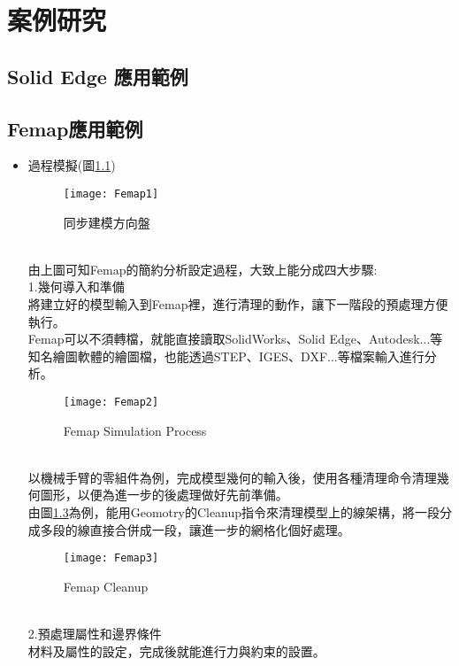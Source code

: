 \chapter{案例研究}
\section{Solid Edge 應用範例}
\section{Femap應用範例}
\begin{itemize}
\item 過程模擬(圖\ref{3.02})\\
\begin{figure}[hbt!]
\begin{center}
\texttt{[image: Femap1]}
\caption{\Large 同步建模方向盤}\label{3.02}
\end{center}
\end{figure}
\\
\qquad 由上圖可知Femap的簡約分析設定過程，大致上能分成四大步驟:\\

1.幾何導入和準備\\
\qquad 將建立好的模型輸入到Femap裡，進行清理的動作，讓下一階段的預處理方便執行。\\
\qquad Femap可以不須轉檔，就能直接讀取SolidWorks、Solid Edge、Autodesk...等知名繪圖軟體的繪圖檔，也能透過STEP、IGES、DXF...等檔案輸入進行分析。\\
\begin{figure}[hbt!]
\begin{center}
\texttt{[image: Femap2]}
\caption{\Large Femap Simulation Process}\label{3.03}
\end{center}
\end{figure}
\\
\qquad 以機械手臂的零組件為例，完成模型幾何的輸入後，使用各種清理命令清理幾何圖形，以便為進一步的後處理做好先前準備。\\

\qquad 由圖\ref{3.01}為例，能用Geomotry的Cleanup指令來清理模型上的線架構，將一段分成多段的線直接合併成一段，讓進一步的網格化個好處理。\\
\begin{figure}[hbt!]
\begin{center}
\texttt{[image: Femap3]}
\caption{\Large Femap Cleanup}\label{3.01}
\end{center}
\end{figure}
\\
2.預處理屬性和邊界條件\\
\qquad 材料及屬性的設定，完成後就能進行力與約束的設置。\\


\end{itemize}
